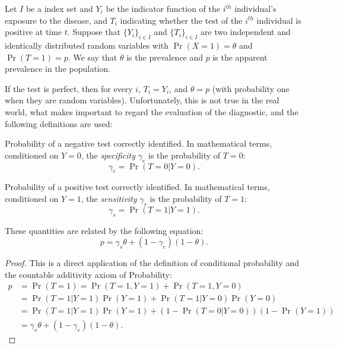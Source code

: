  
Let $I$ be a index set and $Y_i$ be the indicator function of the $i^{th}$ individual's exposure to the disease, and $T_i$
indicating whether the test of the $i^{th}$ individual is positive at time
$t$. Suppose that $\{Y_i\}_{i \in I}$ and $\{T_i\}_{i \in I}$ are two independent and identically distributed
random variables with $\Pr(X = 1) = \theta$ and $\Pr(T = 1) = p$. We say that
$\theta$ is the prevalence and $p$ is the apparent prevalence in the
population. 

If the test is perfect, then for every $i$, $T_i = Y_i$, and
$\theta = p$ (with probability one when they are random variables).
Unfortunately, this is not true in the real world, what makes important to
regard the evaluation of the diagnostic, and the following definitions are used:

\begin{definition}[Specificity]
  Probability of a negative test correctly identified. In mathematical terms,
  conditioned on $Y = 0$, the {\em specificity} $\gamma_e$ is the probability of $T = 0$: 
  \begin{equation}
    \gamma_e = \Pr(T = 0|Y = 0). 
  \end{equation} 
\end{definition}

\begin{definition}[Sensitivity]
  Probability of a positive test correctly identified. In mathematical terms,
  conditioned on $Y = 1$, the {\em sensitivity} $\gamma_s$ is the probability of $T = 1$: 
  \begin{equation}
    \gamma_s = \Pr(T = 1|Y = 1). 
  \end{equation} 
\end{definition}

\begin{theorem} These quantities are related by the following equation:
  \begin{equation}
    p = \gamma_s\theta + (1-\gamma_e)(1-\theta).
  \end{equation}
  
\end{theorem}

\begin{proof}
  This is a direct application of the definition of conditional probability
  and the countable additivity axiom of Probability:
  \begin{equation*}
    \begin{split}
      p &= \Pr(T = 1) = \Pr(T = 1, Y = 1) + \Pr(T = 1, Y = 0) \\
      &= \Pr(T=1|Y=1)\Pr(Y=1) + \Pr(T=1|Y=0)\Pr(Y=0) \\
      &= \Pr(T=1|Y=1)\Pr(Y=1) + (1 - \Pr(T=0|Y=0))(1-\Pr(Y=1)) \\
      &= \gamma_s\theta + (1 - \gamma_e)(1-\theta).
    \end{split}
  \end{equation*} 
\end{proof}

